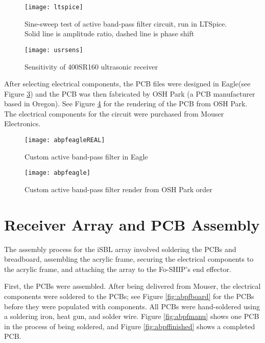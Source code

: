 \documentclass[11pt]{ucthesisCP}
\begin{document}
\begin{figure}[htbp]
	\centering
	\texttt{[image: ltspice]}
	\caption{Sine-sweep test of active band-pass filter circuit, run in LTSpice. Solid line is amplitude ratio, dashed line is phase shift}
	\label{fig:ltspice}
\end{figure}

\begin{figure}[htbp]
	\centering
	\texttt{[image: usrsens]}
	\caption{Sensitivity of 400SR160 ultrasonic receiver \cite{400sr160}}
	\label{fig:usrsens}
\end{figure}

After selecting electrical components, the PCB files were designed in Eagle\textsuperscript{\textregistered}\xspace (see Figure \ref{fig:abpfeagleREAL}) and the PCB was then fabricated by OSH Park (a PCB manufacturer based in Oregon). See Figure \ref{fig:abpfeagle} for the rendering of the PCB from OSH Park. The electrical components for the circuit were purchased from Mouser Electronics.

\begin{figure}[htbp]
	\centering
	\texttt{[image: abpfeagleREAL]}
	\caption{Custom active band-pass filter in Eagle}
	\label{fig:abpfeagleREAL}
\end{figure}

\begin{figure}[htbp]
	\centering
	\texttt{[image: abpfeagle]}
	\caption{Custom active band-pass filter render from OSH Park order}
	\label{fig:abpfeagle}
\end{figure}

\section{Receiver Array and PCB Assembly} \label{sec:3s5}
The assembly process for the iSBL array involved soldering the PCBs and breadboard, assembling the acrylic frame, securing the electrical components to the acrylic frame, and attaching the array to the Fo-SHIP’s end effector.

First, the PCBs were assembled. After being delivered from Mouser, the electrical components were soldered to the PCBs; see Figure \ref{fig:abpfboard} for the PCBs before they were populated with components. All PCBs were hand-soldered using a soldering iron, heat gun, and solder wire. Figure \ref{fig:abpfmanu} shows one PCB in the process of being soldered, and Figure \ref{fig:abpffinished} shows a completed PCB. 
\end{document}
